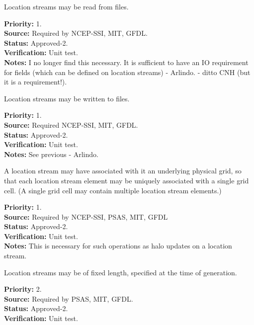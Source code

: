 Location streams may be read from files.
\begin{reqlist}
{\bf Priority:} 1. \\
{\bf Source:} Required by NCEP-SSI, MIT, GFDL. \\
{\bf Status:} Approved-2. \\
{\bf Verification:} Unit test. \\
{\bf Notes:} I no longer find this necessary. It is sufficient to have an IO requirement for fields (which can be defined on location streams) - Arlindo. - ditto CNH (but it is a requirement!).
\end{reqlist}

Location streams may be written to files.
\begin{reqlist}
{\bf Priority:} 1. \\
{\bf Source:} Required NCEP-SSI, MIT, GFDL. \\
{\bf Status:} Approved-2. \\
{\bf Verification:} Unit test. \\
{\bf Notes:} See previous - Arlindo.
\end{reqlist}

A location stream may have associated with it an underlying physical grid, so that each
location stream element may be uniquely associated with a single grid cell. (A single
grid cell may contain multiple location stream elements.)
\begin{reqlist}
{\bf Priority:} 1. \\
{\bf Source:} Required by NCEP-SSI, PSAS, MIT, GFDL \\
{\bf Status:} Approved-2. \\
{\bf Verification:} Unit test. \\
{\bf Notes:} This is necessary for such operations as halo updates on a location
stream.
\end{reqlist}


Location streams may be of fixed length, specified at the time of generation.
\begin{reqlist}
{\bf Priority:} 2. \\
{\bf Source:} Required by PSAS, MIT, GFDL.\\
{\bf Status:} Approved-2. \\
{\bf Verification:} Unit test. 
\end{reqlist}

